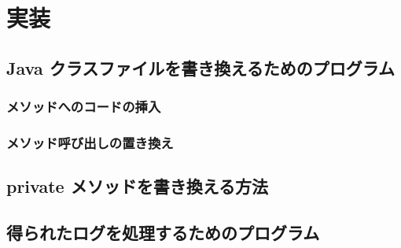 \section{実装}
\label{sec:instrument}
\subsection{Java クラスファイルを書き換えるためのプログラム}

\subsubsection{メソッドへのコードの挿入}

\subsubsection{メソッド呼び出しの置き換え}

\subsection{private メソッドを書き換える方法}
\subsection{得られたログを処理するためのプログラム}